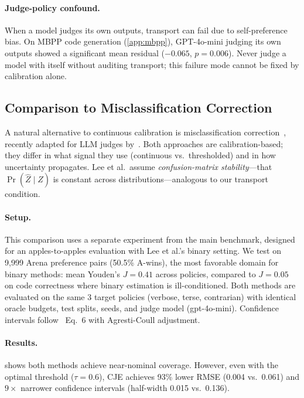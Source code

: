 \paragraph{Judge-policy confound.}
When a model judges its own outputs, transport can fail due to self-preference bias. On MBPP code generation (\cref{app:mbpp}), GPT-4o-mini judging its own outputs showed a significant mean residual ($-0.065$, $p{=}0.006$). Never judge a model with itself without auditing transport; this failure mode cannot be fixed by calibration alone.

\subsection{Comparison to Misclassification Correction}
\label{ssec:binary}

A natural alternative to continuous calibration is misclassification correction~\citep{RoganGladen1978}, recently adapted for LLM judges by~\citet{Lee2025LLMJudgeReporting}. Both approaches are calibration-based; they differ in what signal they use (continuous vs.\ thresholded) and in how uncertainty propagates. Lee et al.\ assume \emph{confusion-matrix stability}---that $\Pr(\hat Z \mid Z)$ is constant across distributions---analogous to our transport condition.

\paragraph{Setup.} This comparison uses a separate experiment from the main benchmark, designed for an apples-to-apples evaluation with Lee et al.'s binary setting.
We test on 9,999 Arena preference pairs (50.5\% A-wins), the most favorable domain for binary methods: mean Youden's $J = 0.41$ across policies, compared to $J = 0.05$ on code correctness where binary estimation is ill-conditioned. Both methods are evaluated on the same 3 target policies (verbose, terse, contrarian) with identical oracle budgets, test splits, seeds, and judge model (gpt-4o-mini). Confidence intervals follow~\citet{Lee2025LLMJudgeReporting} Eq.~6 with Agresti-Coull adjustment.



\paragraph{Results.}  shows both methods achieve near-nominal coverage. However, even with the optimal threshold ($\tau{=}0.6$), CJE achieves 93\% lower RMSE (0.004 vs.\ 0.061) and $9\times$ narrower confidence intervals (half-width 0.015 vs.\ 0.136).

